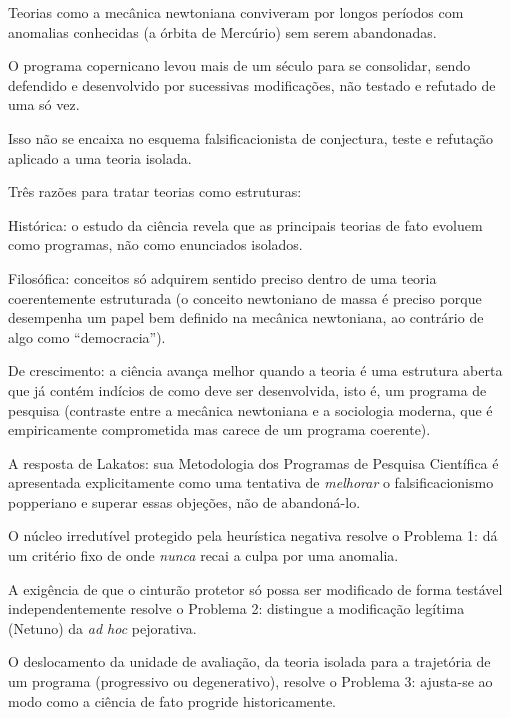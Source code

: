 \documentclass[10pt]{extarticle}
\begin{document}
\begin{itemize}
{\begin{topicos}
\begin{topicos}
  \item Teorias como a mecânica newtoniana conviveram por longos períodos com anomalias conhecidas (a órbita de Mercúrio) sem serem abandonadas.
  \item O programa copernicano levou mais de um século para se consolidar, sendo defendido e desenvolvido por sucessivas modificações, não testado e refutado de uma só vez.
  \item Isso não se encaixa no esquema falsificacionista de conjectura, teste e refutação aplicado a uma teoria isolada.
  \end{topicos}
\item Três razões para tratar teorias como estruturas:
  \begin{topicos}
  \item Histórica: o estudo da ciência revela que as principais teorias de fato evoluem como programas, não como enunciados isolados.
  \item Filosófica: conceitos só adquirem sentido preciso dentro de uma teoria coerentemente estruturada (o conceito newtoniano de massa é preciso porque desempenha um papel bem definido na mecânica newtoniana, ao contrário de algo como \enquote{democracia}).
  \item De crescimento: a ciência avança melhor quando a teoria é uma estrutura aberta que já contém indícios de como deve ser desenvolvida, isto é, um programa de pesquisa (contraste entre a mecânica newtoniana e a sociologia moderna, que é empiricamente comprometida mas carece de um programa coerente).
  \end{topicos}
\item A resposta de Lakatos: sua Metodologia dos Programas de Pesquisa Científica é apresentada explicitamente como uma tentativa de \emph{melhorar} o falsificacionismo popperiano e superar essas objeções, não de abandoná-lo.
  \begin{topicos}
  \item O núcleo irredutível protegido pela heurística negativa resolve o Problema 1: dá um critério fixo de onde \emph{nunca} recai a culpa por uma anomalia.
  \item A exigência de que o cinturão protetor só possa ser modificado de forma testável independentemente resolve o Problema 2: distingue a modificação legítima (Netuno) da \emph{ad hoc} pejorativa.
  \item O deslocamento da unidade de avaliação, da teoria isolada para a trajetória de um programa (progressivo ou degenerativo), resolve o Problema 3: ajusta-se ao modo como a ciência de fato progride historicamente.
  \end{topicos}
\end{topicos}
}
\end{itemize}
\end{document}
